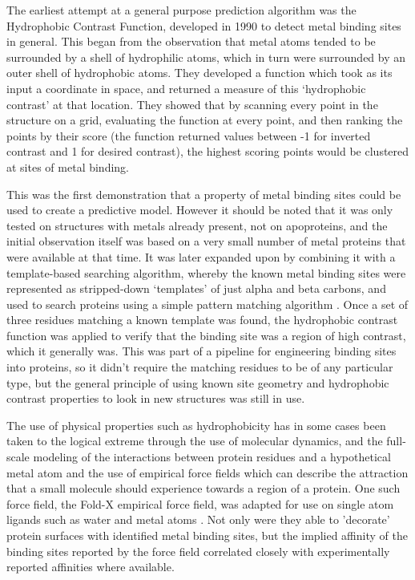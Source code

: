 
The earliest attempt at a general purpose prediction algorithm was the Hydrophobic Contrast Function, developed in 1990 \cite{yamashita1990metal} to detect metal binding sites in general. This began from the observation that metal atoms tended to be surrounded by a shell of hydrophilic atoms, which in turn were surrounded by an outer shell of hydrophobic atoms. They developed a function which took as its input a coordinate in space, and returned a measure of this `hydrophobic contrast' at that location. They showed that by scanning every point in the structure on a grid, evaluating the function at every point, and then ranking the points by their score (the function returned values between -1 for inverted contrast and 1 for desired contrast), the highest scoring points would be clustered at sites of metal binding.

This was the first demonstration that a property of metal binding sites could be used to create a predictive model. However it should be noted that it was only tested on structures with metals already present, not on apoproteins, and the initial observation itself was based on a very small number of metal proteins that were available at that time. It was later expanded upon by combining it with a template-based searching algorithm, whereby the known metal binding sites were represented as stripped-down `templates' of just alpha and beta carbons, and used to search proteins using a simple pattern matching algorithm \cite{gregory1993prediction}. Once a set of three residues matching a known template was found, the hydrophobic contrast function was applied to verify that the binding site was a region of high contrast, which it generally was. This was part of a pipeline for engineering binding sites into proteins, so it didn't require the matching residues to be of any particular type, but the general principle of using known site geometry and hydrophobic contrast properties to look in new structures was still in use.

The use of physical properties such as hydrophobicity has in some cases been taken to the logical extreme through the use of molecular dynamics, and the full-scale modeling of the interactions between protein residues and a hypothetical metal atom and the use of empirical force fields which can describe the attraction that a small molecule should experience towards a region of a protein. One such force field, the Fold-X empirical force field, was adapted for use on single atom ligands such as water and metal atoms \cite{schymkowitz2005}. Not only were they able to 'decorate' protein surfaces with identified metal binding sites, but the implied affinity of the binding sites reported by the force field correlated closely with experimentally reported affinities where available.

